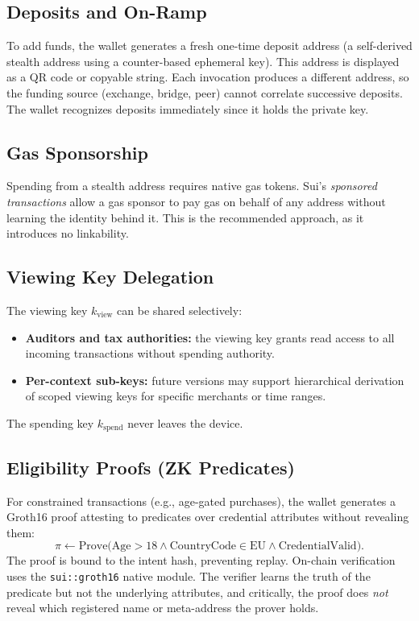 \documentclass[11pt]{article}
\begin{document}
\subsection{Deposits and On-Ramp}
To add funds, the wallet generates a fresh one-time deposit address (a self-derived stealth address using a counter-based ephemeral key). This address is displayed as a QR code or copyable string. Each invocation produces a different address, so the funding source (exchange, bridge, peer) cannot correlate successive deposits. The wallet recognizes deposits immediately since it holds the private key.

\subsection{Gas Sponsorship}
Spending from a stealth address requires native gas tokens. Sui's \emph{sponsored transactions} allow a gas sponsor to pay gas on behalf of any address without learning the identity behind it. This is the recommended approach, as it introduces no linkability.

\subsection{Viewing Key Delegation}
The viewing key $k_{\mathrm{view}}$ can be shared selectively:
\begin{itemize}
  \item \textbf{Auditors and tax authorities:} the viewing key grants read access to all incoming transactions without spending authority.
  \item \textbf{Per-context sub-keys:} future versions may support hierarchical derivation of scoped viewing keys for specific merchants or time ranges.
\end{itemize}
The spending key $k_{\mathrm{spend}}$ never leaves the device.

\subsection{Eligibility Proofs (ZK Predicates)}
For constrained transactions (e.g., age-gated purchases), the wallet generates a Groth16 proof attesting to predicates over credential attributes without revealing them:
$$
\pi \leftarrow \mathrm{Prove}\big(\mathrm{Age} > 18 \land \mathrm{CountryCode} \in \mathrm{EU} \land \mathrm{CredentialValid}\big).
$$
The proof is bound to the intent hash, preventing replay. On-chain verification uses the \texttt{sui::groth16} native module. The verifier learns the truth of the predicate but not the underlying attributes, and critically, the proof does \emph{not} reveal which registered name or meta-address the prover holds.
\end{document}
